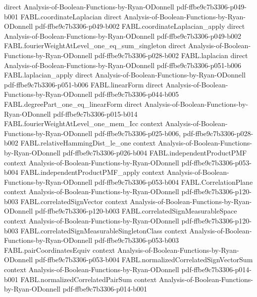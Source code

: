 \begin{theorem}
  {direct}
  {Analysis-of-Boolean-Functions-by-Ryan-ODonnell}
  {pdf-ffbe9c7b3306-p049-b001}
\proofstep
  {FABL.coordinateLaplacian}
  {direct}
  {Analysis-of-Boolean-Functions-by-Ryan-ODonnell}
  {pdf-ffbe9c7b3306-p049-b002}
\proofstep
  {FABL.coordinateLaplacian_apply}
  {direct}
  {Analysis-of-Boolean-Functions-by-Ryan-ODonnell}
  {pdf-ffbe9c7b3306-p049-b002}
\proofstep
  {FABL.fourierWeightAtLevel_one_eq_sum_singleton}
  {direct}
  {Analysis-of-Boolean-Functions-by-Ryan-ODonnell}
  {pdf-ffbe9c7b3306-p028-b002}
\proofstep
  {FABL.laplacian}
  {direct}
  {Analysis-of-Boolean-Functions-by-Ryan-ODonnell}
  {pdf-ffbe9c7b3306-p051-b006}
\proofstep
  {FABL.laplacian_apply}
  {direct}
  {Analysis-of-Boolean-Functions-by-Ryan-ODonnell}
  {pdf-ffbe9c7b3306-p051-b006}
\proofstep
  {FABL.linearForm}
  {direct}
  {Analysis-of-Boolean-Functions-by-Ryan-ODonnell}
  {pdf-ffbe9c7b3306-p044-b005}
\proofstep
  {FABL.degreePart_one_eq_linearForm}
  {direct}
  {Analysis-of-Boolean-Functions-by-Ryan-ODonnell}
  {pdf-ffbe9c7b3306-p015-b014}
\proofstep
  {FABL.fourierWeightAtLevel_one_mem_Icc}
  {context}
  {Analysis-of-Boolean-Functions-by-Ryan-ODonnell}
  {pdf-ffbe9c7b3306-p025-b006,
    pdf-ffbe9c7b3306-p028-b002}
\proofstep
  {FABL.relativeHammingDist_le_one}
  {context}
  {Analysis-of-Boolean-Functions-by-Ryan-ODonnell}
  {pdf-ffbe9c7b3306-p026-b004}
\proofstep
  {FABL.independentProductPMF}
  {context}
  {Analysis-of-Boolean-Functions-by-Ryan-ODonnell}
  {pdf-ffbe9c7b3306-p053-b004}
\proofstep
  {FABL.independentProductPMF_apply}
  {context}
  {Analysis-of-Boolean-Functions-by-Ryan-ODonnell}
  {pdf-ffbe9c7b3306-p053-b004}
\proofstep
  {FABL.CorrelationPlane}
  {context}
  {Analysis-of-Boolean-Functions-by-Ryan-ODonnell}
  {pdf-ffbe9c7b3306-p120-b003}
\proofstep
  {FABL.correlatedSignVector}
  {context}
  {Analysis-of-Boolean-Functions-by-Ryan-ODonnell}
  {pdf-ffbe9c7b3306-p120-b003}
\proofstep
  {FABL.correlatedSignMeasurableSpace}
  {context}
  {Analysis-of-Boolean-Functions-by-Ryan-ODonnell}
  {pdf-ffbe9c7b3306-p120-b003}
\proofstep
  {FABL.correlatedSignMeasurableSingletonClass}
  {context}
  {Analysis-of-Boolean-Functions-by-Ryan-ODonnell}
  {pdf-ffbe9c7b3306-p053-b003}
\proofstep
  {FABL.pairCoordinatesEquiv}
  {context}
  {Analysis-of-Boolean-Functions-by-Ryan-ODonnell}
  {pdf-ffbe9c7b3306-p053-b004}
\proofstep
  {FABL.normalizedCorrelatedSignVectorSum}
  {context}
  {Analysis-of-Boolean-Functions-by-Ryan-ODonnell}
  {pdf-ffbe9c7b3306-p014-b001}
\proofstep
  {FABL.normalizedCorrelatedPairSum}
  {context}
  {Analysis-of-Boolean-Functions-by-Ryan-ODonnell}
  {pdf-ffbe9c7b3306-p014-b001}

\end{theorem}
